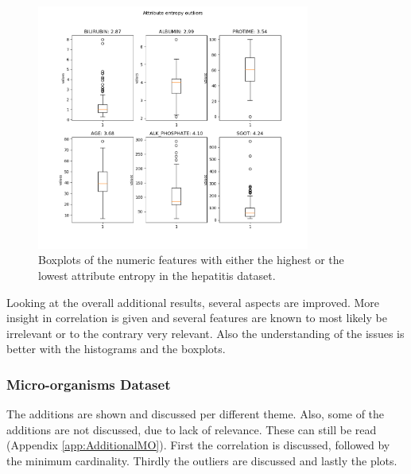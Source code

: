 \documentclass[10pt,a4paper]{report}
\begin{document}
\begin{itemize}
\begin{enumerate}
			\begin{figure}[H]
				\centering
				\includegraphics[width=0.8\textwidth]{Hep_AttEnt_Num.png}
				\caption{Boxplots of the numeric features with either the highest or the lowest attribute entropy in the hepatitis dataset.}
				\label{fig:HepAttEntNum}
			\end{figure}
			
		\end{enumerate}
		
	\end{itemize}
	
	Looking at the overall additional results, several aspects are improved. More insight in correlation is given and several features are known to most likely be irrelevant or to the contrary very relevant. Also the understanding of the issues is better with the histograms and the boxplots.
	
	\subsubsection{Micro-organisms Dataset}
	\label{DEsubsec:AdditionalResultMO}
	
	The additions are shown and discussed per different theme. Also, some of the additions are not discussed, due to lack of relevance. These can still be read (Appendix \ref{app:AdditionalMO}). First the correlation is discussed, followed by the minimum cardinality. Thirdly the outliers are discussed and lastly the plots.
	
\end{document}
